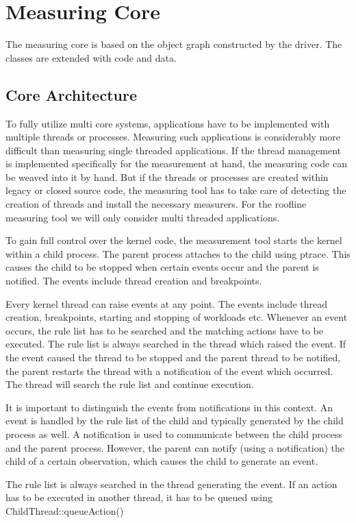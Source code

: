 \documentclass[a4paper,12pt]{report}
\newcommand{\method}[1]{\textsf{#1}}
\begin{document}
\section{Measuring Core}
The measuring core is based on the object graph constructed by the driver. The
classes are extended with code and data.

\subsection{Core Architecture}
To fully utilize multi core systems, applications have to be implemented with
multiple threads or processes. Measuring such applications is considerably more
difficult than measuring single threaded applications. If the thread management
is implemented specifically for the measurement at hand, the measuring code can
be weaved into it by hand. But if the threads or processes are created within
legacy or closed source code, the measuring tool has to take care of detecting
the creation of threads and install the necessary measurers. For the roofline
measuring tool we will only consider multi threaded applications.

To gain full control over the kernel code, the measurement tool starts the
kernel within a child process. The parent process attaches to the child using
ptrace. This causes the child to be stopped when certain events occur and the
parent is notified. The events include thread creation and breakpoints.

Every kernel thread can raise events at any point. The events include thread
creation, breakpoints, starting and stopping of workloads etc. Whenever an event
occurs, the rule list has to be searched and the matching actions have to be
executed. The rule list is always searched in the thread which raised the event.
If the event caused the thread to be stopped and the parent thread to be
notified, the parent restarts the thread with a notification of the event which
occurred. The thread will search the rule list and continue execution.

It is important to distinguish the events from notifications in this context. An
event is handled by the rule list of the child and typically generated by the
child process as well. A notification is used to communicate between the child
process and the parent process. However, the parent can notify (using a
notification) the child of a certain observation, which causes the child to
generate an event.

The rule list is always searched in the thread generating the event. If an
action has to be executed in another thread, it has to be queued using
\method{ChildThread::queueAction()}
\end{document}
